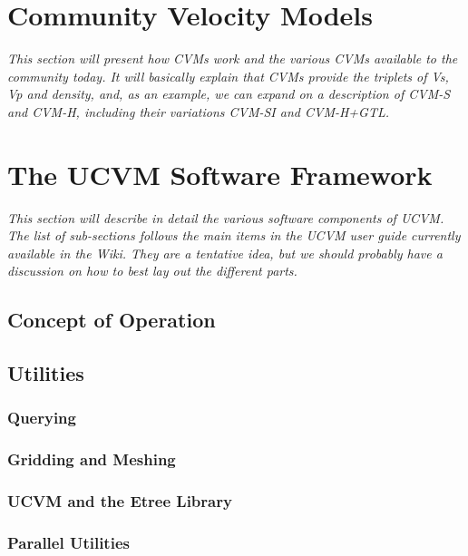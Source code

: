 


\section{Community Velocity Models}
\label{sec:cvms}

\textit{
\color{blue}
This section will present how CVMs work and the various CVMs available to the community today. It will basically explain that CVMs provide the triplets of Vs, Vp and density, and, as an example, we can expand on a description of CVM-S and CVM-H, including their variations CVM-SI and CVM-H+GTL.
}

\section{The UCVM Software Framework}
\label{sec:ucvm}

\textit{
\color{blue}
This section will describe in detail the various software components of UCVM. The list of sub-sections follows the main items in the UCVM user guide currently available in the Wiki. They are a tentative idea, but we should probably have a discussion on how to best lay out the different parts.
}

\subsection{Concept of Operation}

\subsection{Utilities}

\subsubsection{Querying}

\subsubsection{Gridding and Meshing}

\subsubsection{UCVM and the Etree Library}

\subsubsection{Parallel Utilities}

